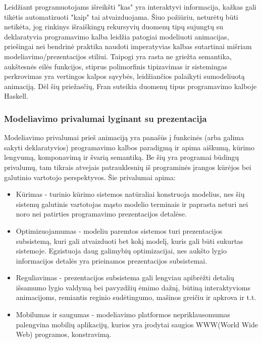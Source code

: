 Leidžiant programuotojams išreikšti "kas" yra interaktyvi informacija, kažkas gali tikėtis automatizuoti "kaip" tai atvaizduojama. Šiuo požiūriu, neturėtų būti netikėta, jog rinkinys išraiškingų rekursyvių duomenų tipų sujungtų su deklaratyvia programavimo kalba leidžia patogiai modeliuoti animacijas, priešingai nei bendrinė praktika naudoti imperatyvias kalbas sutartinai mišriam modeliavimo/prezentacijos stiliui. Taipogi yra rasta ne griežta semantika, aukštesnės eilės funkcijos, stiprus polimorfinis tipizavimas ir sistemingas perkrovimas yra vertingos kalpos sąvybės, leidžiančios palaikyti sumodeliuotą animaciją. Dėl šių priežasčių, Fran suteikia duomenų tipus programavimo kalboje Haskell.

\subsubsection{Modeliavimo privalumai lyginant su prezentacija}

Modeliavimo privalumai prieš animaciją yra panašūs į funkcinės (arba galima sakyti deklaratyvios) programavimo kalbos paradigmą ir apima aiškumą, kūrimo lengvumą, komponavimą ir švarią semantiką. Be šių yra programai būdingų privalumų, tam tikrais atvejais patrauklesnių iš programinės įrangos kūrėjos bei galutinio vartotojo perspektyvos. Šie privalumai apima:

\begin{itemize}

	\item Kūrimas - turinio kūrimo sistemos natūraliai konstruoja modelius, nes šių sistemų galutinis vartotojas mąsto modelio terminais ir paprasta neturi nei noro nei patirties programavimo prezentacijos detalėse.

	\item Optimizuojamumas - modeliu paremtos sistemos turi prezentacijos subsistemą, kuri gali atvaizduoti bet kokį modelį, kuris gali būti sukurtas sistemoje. Egzistuoja daug galimybių optimizacijai, nes aukšto lygio informacijos detalės yra prieinamos prezentacijos subsistemai.

	\item Reguliavimas - prezentacijos subsistema gali lengviau apibrėžti detalių išsamumo lygio valdymą bei pavyzdžių ėmimo dažnį, būtiną interaktyvioms animacijoms, remiantis reginio sudėtingumo, mašinos greičiu ir apkrova ir t.t.

	\item Mobilumas ir saugumas - modeliavimo platformos nepriklausomumas palengvina mobilių aplikacijų, kurios yra įrodytai saugios WWW(World Wide Web) programos, konstravimą.

\end{itemize}

